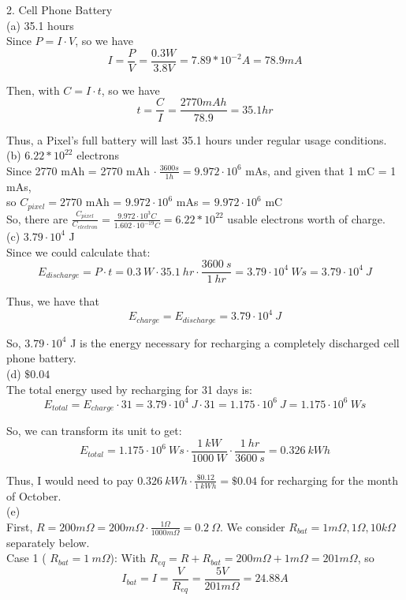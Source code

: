 \documentclass{article}
\begin{document}
{\Large 2. Cell Phone Battery} \\[.5cm]
(a) 35.1 hours \\

Since $P = I\cdot V$, so we have $$I = \frac{P}{V} = \frac{0.3W}{3.8V} = 7.89*10^{-2} A = 78.9 mA$$

Then, with $C = I\cdot t$, so we have
$$t = \frac{C}{I} = \frac{2770 mAh}{78.9} = 35.1 hr$$

Thus, a Pixel’s full battery will last 35.1 hours under regular usage conditions. \\[1cm]
(b) $6.22*10^{22}$ electrons \\

Since 2770 mAh = 2770 mAh $\cdot\ \frac{3600s}{1h} =
9.972\cdot10^6$ mAs, and given that 1 mC = 1 mAs, \\

so $C_{pixel} = 2770$ mAh = $9.972\cdot10^6$ mAs = $9.972\cdot10^6$ mC \\

So, there are
$\frac{C_{pixel}}{C_{electron}} = \frac{9.972\cdot10^3 C}{1.602\cdot10^{-19}C} = 6.22*10^{22}$
usable electrons worth of charge. \\[1cm]
(c) $3.79\cdot10^4$ J \\

Since we could calculate that:
$$E_{discharge} = P\cdot t = 0.3\ W\cdot35.1\ hr\cdot\frac{3600\ s}{1\ hr} = 3.79\cdot10^4\ Ws = 3.79\cdot10^4\ J$$

Thus, we have that
$$E_{charge} = E_{discharge} = 3.79\cdot10^4\ J$$

So, $3.79\cdot10^4$ J is the energy necessary for recharging a completely discharged cell phone battery. \\[1cm]
(d) $\$0.04$ \\

The total energy used by recharging for 31 days is:
$$E_{total} = E_{charge}\cdot 31 = 3.79\cdot10^4\ J\cdot31 = 1.175\cdot10^6\ J = 1.175\cdot10^6\ Ws$$

So, we can transform its unit to get:
$$E_{total} = 1.175\cdot10^6\ Ws\cdot\frac{1\ kW}{1000\ W}\cdot\frac{1\ hr}{3600\ s} = 0.326\ kWh$$

Thus, I would need to pay $0.326\ kWh\cdot\frac{\$0.12}{1\ kWh} =
\$0.04$ for recharging for the month of October. \pagebreak\\
(e) \\[.3cm]
First, $R = 200m\Omega = 200m\Omega\cdot\frac{1\Omega}{1000m\Omega} = 0.2\ \Omega$. We consider $R_{bat} = 1m\Omega, 1\Omega, 10k\Omega$ separately below. \\[.75cm]
Case 1 ({\color{red} $R_{bat} = 1\ m\Omega$}): With $R_{eq} = R + R_{bat} = 200m\Omega + 1 m\Omega = 201 m\Omega$, so
$$I_{bat} = I = \frac{V}{R_{eq}} = \frac{5V}{201m\Omega} = 24.88A$$
\end{document}
